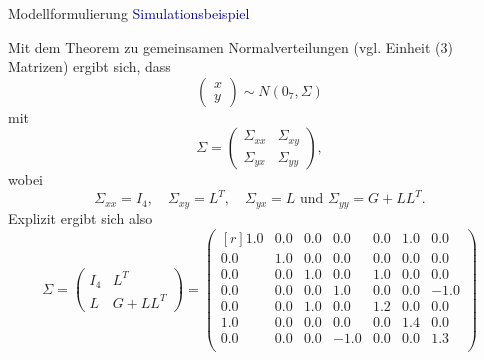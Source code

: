 \documentclass[
  8pt,
  ignorenonframetext,
]{beamer}
\begin{document}
\begin{frame}{Modellformulierung}
\protect\hypertarget{modellformulierung-10}{}
\textcolor{darkblue}{Simulationsbeispiel}

\footnotesize

Mit dem Theorem zu gemeinsamen Normalverteilungen (vgl. Einheit (3)
Matrizen) ergibt sich, dass \begin{equation}
\begin{pmatrix} x \\ y \end{pmatrix}
\sim N(0_7,\Sigma)
\end{equation} mit \begin{equation}
\Sigma
=
\begin{pmatrix}
\Sigma_{xx} & \Sigma_{xy} \\
\Sigma_{yx} & \Sigma_{yy}
\end{pmatrix},
\end{equation} wobei \begin{equation}
\Sigma_{xx} = I_4, \quad
\Sigma_{xy} = L^T, \quad
\Sigma_{yx} = L \mbox{ und }
\Sigma_{yy} = G + LL^T.
\end{equation} Explizit ergibt sich also \begin{equation}
\Sigma
 =
\begin{pmatrix}
I_4 &  L^T \\
L   &  G + LL^T
\end{pmatrix}
=
\begin{pmatrix*}[r]
1.0 & 0.0 & 0.0 &  0.0 & 0.0 & 1.0 &  0.0 \\
0.0 & 1.0 & 0.0 &  0.0 & 0.0 & 0.0 &  0.0 \\
0.0 & 0.0 & 1.0 &  0.0 & 1.0 & 0.0 &  0.0 \\
0.0 & 0.0 & 0.0 &  1.0 & 0.0 & 0.0 & -1.0 \\
0.0 & 0.0 & 1.0 &  0.0 & 1.2 & 0.0 &  0.0 \\
1.0 & 0.0 & 0.0 &  0.0 & 0.0 & 1.4 &  0.0 \\
0.0 & 0.0 & 0.0 & -1.0 & 0.0 & 0.0 &  1.3 \\
\end{pmatrix*}
\end{equation}
\end{frame}
\end{document}
